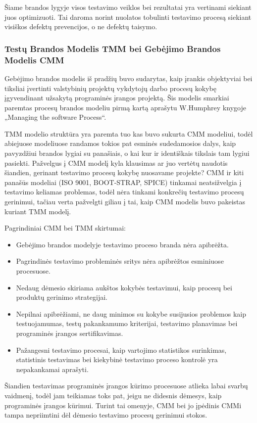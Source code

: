 \documentclass{VUMIFPSkursinis}
\begin{document}
Šiame brandos lygyje visos testavimo veiklos bei rezultatai yra vertinami siekiant juos optimizuoti. Tai daroma norint nuolatos tobulinti testavimo procesą siekiant visiškos defektų prevencijos, o ne defektų taisymo.

\subsubsection{Testų Brandos Modelis TMM bei Gebėjimo Brandos Modelis CMM}
Gebėjimo brandos modelis iš pradžių buvo sudarytas, kaip įrankis objektyviai bei tiksliai įvertinti valstybinių projektų vykdytojų darbo procesų kokybę įgyvendinant užsakytą programinės įrangos projektą. Šis modelis smarkiai paremtas procesų brandos modeliu pirmą kartą aprašytu W.Humphrey knygoje „Managing the software Process“. \cite{Paulk:1993:CMM:624600.625307}

TMM modelio struktūra yra paremta tuo kas buvo sukurta CMM modeliui, todėl abiejuose modeliuose randamos tokios pat esminės sudedamosios dalys, kaip pavyzdžiui brandos lygiai su panašiais, o kai kur ir identiškais tikslais tam lygiui pasiekti. Pažvelgus į CMM modelį kyla klausimas ar juo vertėtų naudotis šiandien, gerinant testavimo procesų kokybę nuosavame projekte? CMM ir kiti panašūs modeliai (ISO 9001, BOOT-STRAP, SPICE) tinkamai neatsižvelgia į testavimo keliamas problemas, todėl nėra tinkami konkrečių testavimo procesų gerinimui, tačiau verta pažvelgti giliau į tai, kaip CMM modelis buvo pakeistas kuriant TMM modelį.

Pagrindiniai CMM bei TMM skirtumai:
\begin{itemize}
   \item Gebėjimo brandos modelyje testavimo proceso branda nėra apibrėžta.
   \item Pagrindinės testavimo probleminės sritys nėra apibrėžtos esminiuose procesuose.
   \item Nedaug dėmesio skiriama aukštos kokybės testavimui, kaip procesų bei produktų gerinimo strategijai.
   \item Nepilnai apibrėžiami, ne daug minimos su kokybe susijusios problemos kaip testuojamumas, testų pakankamumo kriterijai, testavimo planavimas bei programinės įrangos sertifikavimas.
   \item Pažangesni testavimo procesai, kaip vartojimo statistikos surinkimas, statistinis testavimas bei kiekybinė testavimo proceso kontrolė yra nepakankamai aprašyti.
\end{itemize}
Šiandien testavimas programinės įrangos kūrimo procesuose atlieka labai svarbų vaidmenį, todėl jam teikiamas toks pat, jeigu ne didesnis dėmesys, kaip programinės įrangos kūrimui. Turint tai omenyje, CMM bei jo įpėdinis CMMi tampa nepriimtini dėl dėmesio testavimo procesų gerinimui stokos.
\end{document}
